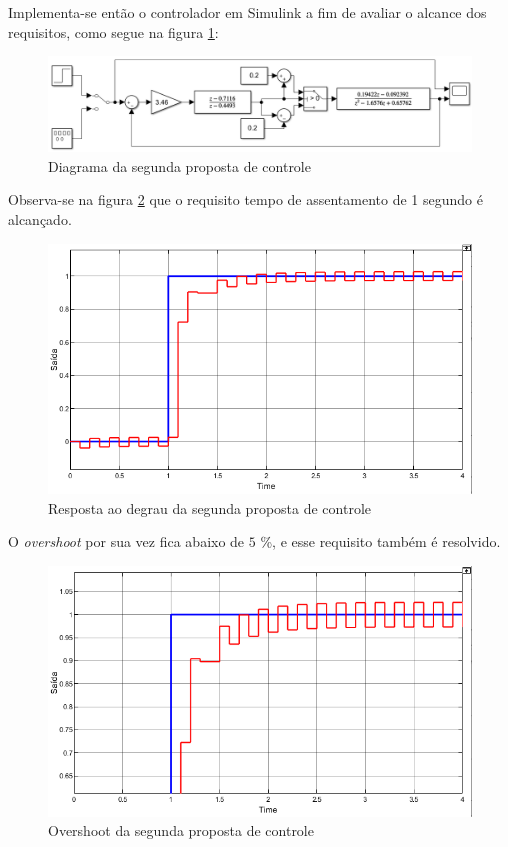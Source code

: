 \documentclass[a4paper,11pt]{article}
\begin{document}
Implementa-se então o controlador em Simulink a fim de avaliar o alcance dos requisitos, como segue na figura \ref{fig:projetoavanco}:

\begin{figure}[H]
    \centering
    \includegraphics[width=\linewidth]{src/tex/img/controle_2.PNG}
    \caption{Diagrama da segunda proposta de controle}
    \label{fig:projetoavanco}
\end{figure}

Observa-se na figura \ref{fig:degrauavanco} que o requisito tempo de assentamento de 1 segundo é alcançado.

\begin{figure}[H]
    \centering
    \includegraphics[width=\linewidth]{src/tex/img/saida_controle_2.png}
    \caption{Resposta ao degrau da segunda proposta de controle}
    \label{fig:degrauavanco}
\end{figure}

O \textit{overshoot} por sua vez fica abaixo de $5$ \%, e esse requisito também é resolvido.

\begin{figure}[H]
    \centering
    \includegraphics[width=\linewidth]{src/tex/img/saida_controle_2_up.PNG}
    \caption{Overshoot da segunda proposta de controle}
    \label{fig:lgr}
\end{figure}
\end{document}
